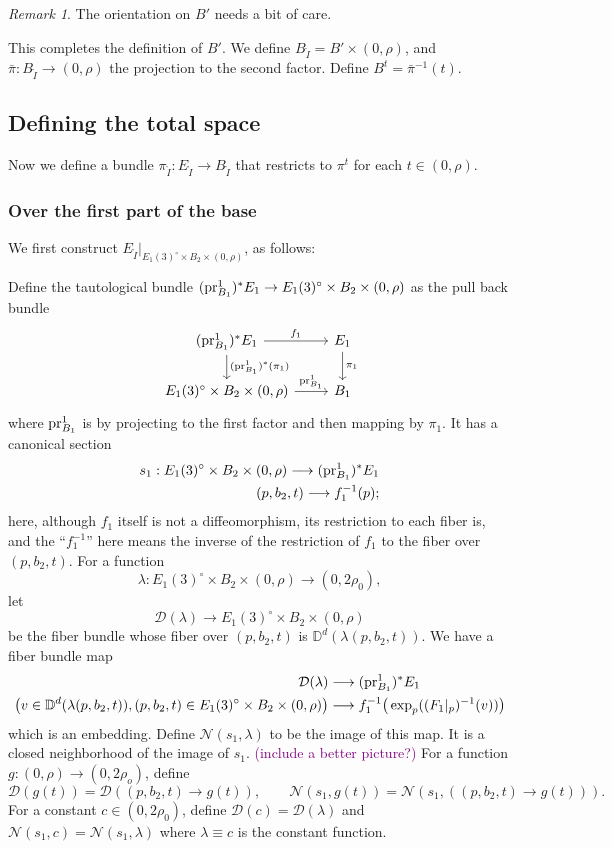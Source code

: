 \documentclass[11pt]{article}
\theoremstyle{definition}
\theoremstyle{remark}
\newtheorem{rmk}[thm]{Remark}
\def\D{\mathbb{D}}
\def\cN{\mathcal{N}}
\def\rI{{\mathring{I}}}
\def\cmt#1{\textcolor{purple}{(#1)}}
\def\pr{{\textnormal{pr}}}
\begin{document}
\begin{rmk}
The orientation on $B'$ needs a bit of care. 
\end{rmk}


This completes the definition of $B'$. 
We define $B_\rI=B'\times (0,\rho)$, and $\bar\pi:B_{\rI}\to(0,\rho)$ the projection to the second factor. Define $B^t=\bar\pi^{-1}(t)$. 


\subsection{Defining the total space}
\label{EI_subsec}
Now we define a bundle $\pi_\rI:E_\rI\to B_\rI$ that restricts to $\pi^t$ for each $t\in(0,\rho)$. 

\subsubsection{Over the first part of the base}
\label{first_subsubsec}
We first construct $E_\rI|_{E_1(3)^\circ\times B_2\times (0,\rho)}$, as follows: 

Define the tautological bundle $(\pr^1_{B_1})^*E_1\to E_1(3)^\circ\times B_2\times (0,\rho)$ as the pull back bundle
\[\begin{tikzcd}
(\pr^1_{B_1})^*E_1\rar["f_1"]\dar["(\pr^1_{B_1})^*(\pi_1)"] & E_1\dar["\pi_1"] \\
E_1(3)^\circ\times B_2\times (0,\rho)\rar["\pr^1_{B_1}"] & B_1
\end{tikzcd}\]
where $\pr^1_{B_1}$ is by projecting to the first factor and then mapping by $\pi_1$. 
It has a canonical section 
\begin{align*}
s_1: E_1(3)^\circ\times B_2\times (0,\rho)\longrightarrow (\pr^1_{B_1})^*E_1\\
(p,b_2,t)\longrightarrow f^{-1}_1(p);
\end{align*}
here, although $f_1$ itself is not a diffeomorphism, its restriction to each fiber is, and the ``$f_1^{-1}$'' here means the inverse of the restriction of $f_1$ to the fiber over $(p,b_2,t)$. 
For a function 
$$\lambda:E_1(3)^\circ\times B_2\times (0,\rho)\longrightarrow(0,2\rho_0),$$
let 
$$\mathcal{D}(\lambda)\longrightarrow E_1(3)^\circ\times B_2\times (0,\rho)$$ 
be the fiber bundle whose fiber over $(p,b_2,t)$ is $\D^d(\lambda(p,b_2,t))$. 
We have a fiber bundle map 
\begin{align}\label{exp1_eqn}
\mathcal{D}(\lambda)&\longrightarrow (\pr^1_{B_1})^*E_1\\
\big(v\in \D^d(\lambda(p,b_2,t)),(p,b_2,t)\in E_1(3)^\circ\times B_2\times(0,\rho)\big)&\longrightarrow f_1^{-1}\big(\exp_p((F_1|_p)^{-1}(v))\big)\nonumber
\end{align}
which is an embedding. 
Define
$\mathcal{N}(s_1,\lambda)$ to be the image of this map. 
It is a closed neighborhood of the image of $s_1$. 
\cmt{include a better picture?}
For a function $g:(0,\rho)\to(0,2\rho_o)$, define $$\mathcal{D}(g(t))=\mathcal{D}((p,b_2,t)\to g(t)),\qquad\cN(s_1,g(t))=\cN(s_1,((p,b_2,t)\to g(t))).$$
For a constant $c\in(0,2\rho_0)$, define 
$\mathcal{D}(c)=\mathcal{D}(\lambda)$ and $\cN(s_1,c)=\cN(s_1,\lambda)$ where $\lambda\equiv c$ is the constant function. 
\end{document}
